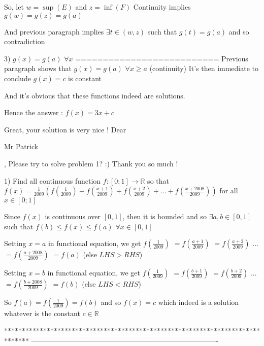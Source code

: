 \begin{solution}
So, let $w=\sup (E)$ and $z=\inf(F)$ Continuity implies $g(w)=g(z)=g(a)$

And previous paragraph implies $\exists t\in(w,z)$ such that $g(t)=g(a)$ and so contradiction

3) $g(x)=g(a)$ $\forall x$
==========================
Previous paragraph shows that $g(x)=g(a)$ $\forall x\ge a$ (continuity)
It's then immediate to conclude $g(x)=c$ is constant

And it's obvious that these functions indeed are solutions.

Hence the answer : $\boxed{f(x)=3x+c}$
\end{solution}



\begin{solution}
	Great, your solution is very nice ! 
Dear \begin{bolded}Mr Patrick\end{bolded}, Please try to solve problem 1? :)
Thank you so much !
\end{solution}



\begin{solution}
	\begin{tcolorbox}1) Find all continuous function $f:[0;1]\to\mathbb{R}$ so that 
$f(x)=\frac{1}{2009}\left(f(\frac{1}{2009})+f(\frac{x+1}{2009})+f(\frac{x+2}{2009})+...+f(\frac{x+2008}{2009})\right) $  for all $x\in [0;1]$\end{tcolorbox}
Since $f(x)$ is continuous over $[0,1]$, then it is bounded and so $\exists a,b\in[0,1]$ such that $f(b)\le f(x)\le f(a)$ $\forall x\in[0,1]$

Setting $x=a$ in functional equation, we get $f(\frac 1{2009})$ $=f(\frac{a+1}{2009})$ $=f(\frac{a+2}{2009})$ ... $=f(\frac{a+2008}{2009})$ $=f(a)$ (else $LHS>RHS$)

Setting $x=b$ in functional equation, we get $f(\frac 1{2009})$ $=f(\frac{b+1}{2009})$ $=f(\frac{b+2}{2009})$ ... $=f(\frac{b+2008}{2009})$ $=f(b)$ (else $LHS < RHS$)

So $f(a)=f(\frac 1{2009})=f(b)$ and so $\boxed{f(x)=c}$ which indeed is a solution whatever is the constant $c\in\mathbb R$
\end{solution}
*******************************************************************************
-------------------------------------------------------------------------------

